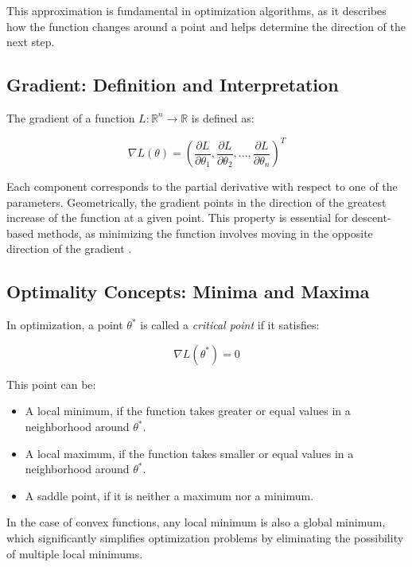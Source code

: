 \documentclass[12pt, letterpaper,conference]{IEEEtran}
\begin{document}
This approximation is fundamental in optimization algorithms, as it describes how the function changes around a point and helps determine the direction of the next step.


\vspace{0.25cm}


\subsection{Gradient: Definition and Interpretation}

The gradient of a function \( L: \mathbb{R}^n \rightarrow \mathbb{R} \) is defined as:

\[
\nabla L(\theta) = \left( \frac{\partial L}{\partial \theta_1}, \frac{\partial L}{\partial \theta_2}, \dots, \frac{\partial L}{\partial \theta_n} \right)^T
\]

Each component corresponds to the partial derivative with respect to one of the parameters. Geometrically, the gradient points in the direction of the greatest increase of the function at a given point. This property is essential for descent-based methods, as minimizing the function involves moving in the opposite direction of the gradient \cite{khan-gradient}.

\vspace{0.25cm}

\subsection{Optimality Concepts: Minima and Maxima}

In optimization, a point \( \theta^* \) is called a \textit{critical point} if it satisfies:

\[
\nabla L(\theta^*) = 0
\]

This point can be:
\begin{itemize}
    \item A local minimum, if the function takes greater or equal values in a neighborhood around \( \theta^* \).
    \item A local maximum, if the function takes smaller or equal values in a neighborhood around \( \theta^* \).
    \item A saddle point, if it is neither a maximum nor a minimum.
\end{itemize}

In the case of convex functions, any local minimum is also a global minimum, which significantly simplifies optimization problems by eliminating the possibility of multiple local minimums.
\end{document}

